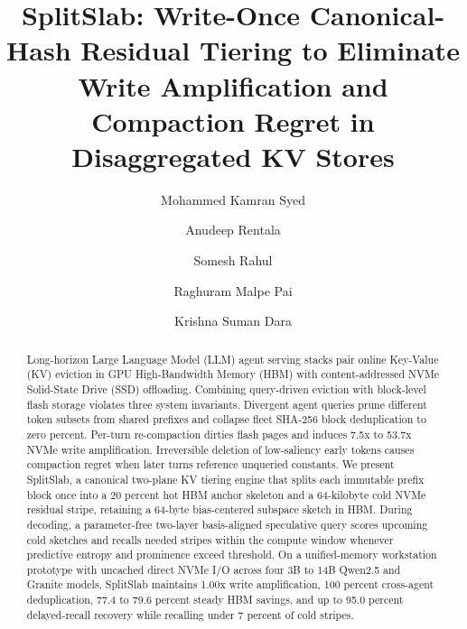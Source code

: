 \documentclass[final,5p,times,twocolumn]{elsarticle}
\theoremstyle{definition}
\theoremstyle{remark}
\begin{document}
\begin{frontmatter}

\title{SplitSlab: Write-Once Canonical-Hash Residual Tiering to Eliminate Write Amplification and Compaction Regret in Disaggregated KV Stores}

\author[1]{Mohammed Kamran Syed}

\author[2]{Anudeep Rentala}

\author[2]{Somesh Rahul}

\author[3]{Raghuram Malpe Pai}

\author[3]{Krishna Suman Dara}





\begin{abstract}
Long-horizon Large Language Model (LLM) agent serving stacks pair online Key-Value (KV) eviction in GPU High-Bandwidth Memory (HBM) with content-addressed NVMe Solid-State Drive (SSD) offloading. Combining query-driven eviction with block-level flash storage violates three system invariants. Divergent agent queries prune different token subsets from shared prefixes and collapse fleet SHA-256 block deduplication to zero percent. Per-turn re-compaction dirties flash pages and induces 7.5x to 53.7x NVMe write amplification. Irreversible deletion of low-saliency early tokens causes compaction regret when later turns reference unqueried constants. We present SplitSlab, a canonical two-plane KV tiering engine that splits each immutable prefix block once into a 20 percent hot HBM anchor skeleton and a 64-kilobyte cold NVMe residual stripe, retaining a 64-byte bias-centered subspace sketch in HBM. During decoding, a parameter-free two-layer basis-aligned speculative query scores upcoming cold sketches and recalls needed stripes within the compute window whenever predictive entropy and prominence exceed threshold. On a unified-memory workstation prototype with uncached direct NVMe I/O across four 3B to 14B Qwen2.5 and Granite models, SplitSlab maintains 1.00x write amplification, 100 percent cross-agent deduplication, 77.4 to 79.6 percent steady HBM savings, and up to 95.0 percent delayed-recall recovery while recalling under 7 percent of cold stripes.
\end{abstract}


\end{frontmatter}
\end{document}

